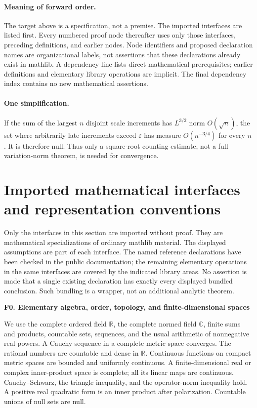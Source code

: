 \documentclass[11pt]{article}
\theoremstyle{remark}\newtheorem{remark}[theorem]{Remark}
\newcommand{\R}{\mathbb R}\newcommand{\C}{\mathbb C}
\newcommand{\lib}[2]{\par\medskip\noindent\textbf{#1. #2}\par}
\begin{document}
\paragraph{Meaning of forward order.}
The target above is a specification, not a premise. The imported interfaces are listed first. Every numbered proof node thereafter uses only those interfaces, preceding definitions, and earlier nodes. Node identifiers and proposed declaration names are organizational labels, not assertions that these declarations already exist in mathlib. A dependency line lists direct mathematical prerequisites; earlier definitions and elementary library operations are implicit. The final dependency index contains no new mathematical assertions.

\paragraph{One simplification.}
If the sum of the largest $n$ disjoint scale increments has $L^{3/2}$ norm $O(\sqrt n)$, the set where arbitrarily late increments exceed $\varepsilon$ has measure $O(n^{-3/4})$ for every $n$. It is therefore null. Thus only a square-root counting estimate, not a full variation-norm theorem, is needed for convergence.

\begingroup\small\tableofcontents\endgroup\clearpage

\section{Imported mathematical interfaces and representation conventions}\label{sec:library}
Only the interfaces in this section are imported without proof. They are mathematical specializations of ordinary mathlib material. The displayed assumptions are part of each interface. The named reference declarations have been checked in the public documentation; the remaining elementary operations in the same interfaces are covered by the indicated library areas. No assertion is made that a single existing declaration has exactly every displayed bundled conclusion. Such bundling is a wrapper, not an additional analytic theorem.

\lib{F0}{Elementary algebra, order, topology, and finite-dimensional spaces}
We use the complete ordered field $\R$, the complete normed field $\C$, finite sums and products, countable sets, sequences, and the usual arithmetic of nonnegative real powers. A Cauchy sequence in a complete metric space converges. The rational numbers are countable and dense in $\R$. Continuous functions on compact metric spaces are bounded and uniformly continuous. A finite-dimensional real or complex inner-product space is complete; all its linear maps are continuous. Cauchy--Schwarz, the triangle inequality, and the operator-norm inequality hold. A positive real quadratic form is an inner product after polarization. Countable unions of null sets are null.
\end{document}
